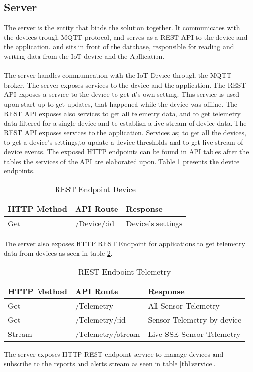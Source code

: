 \subsection{Server}
The server is the entity that binds the solution together. It communicates with the devices trough MQTT protocol, and serves as a REST API to the device and the application. and sits in front of the database, responsible for reading and writing data from the IoT device and the Apllication. \\\\ The server handles communication with the IoT Device through the MQTT broker. 
The server exposes services to the device and the application. The REST API exposes a service to the device to get it's own setting. This service is used upon start-up to get updates, that happened while the device was offline. 
The REST API exposes also services to get all telemetry data, and to get telemetry data filtered for a single device and to establish a live stream of device data. 
The REST API exposes services to the application. Services as; to get all the devices, to get a device's settings,to update a device thresholds and to get live stream of device events. The exposed HTTP endpoints can be found in API tables after the tables the services of the API are elaborated upon. Table \ref{tbl:device} presents the device endpoints. 

\begin{table}[H]
    \centering
    \begin{tabular}{|l|l|l|}
    \hline
    \textbf{HTTP Method}    & \textbf{API Route} & \textbf{Response} \\ \hline
    Get & /Device/:id & Device's settings  \\ \hline
    \end{tabular}
    \caption{REST Endpoint Device}
    \label{tbl:device}
\end{table}
The server also exposes HTTP REST Endpoint for applications to get telemetry data from devices as seen in table \ref{tbl:telemetry}.

\begin{table}[H]
    \centering
    \begin{tabular}{|l|l|p{5cm}|}
    \hline
    \textbf{HTTP Method}    & \textbf{API Route} & \textbf{Response} \\ \hline
    Get & /Telemetry & All Sensor Telemetry  \\ \hline
    Get & /Telemetry/:id & Sensor Telemetry by device \\ \hline
    Stream & /Telemetry/stream & Live SSE Sensor Telemetry  \\ \hline
    \end{tabular}
    \caption{REST Endpoint Telemetry}
    \label{tbl:telemetry}
\end{table}
The server exposes HTTP REST endpoint service to manage devices and subscribe to the reports and alerts stream as seen in table \ref{tbl:service}.

